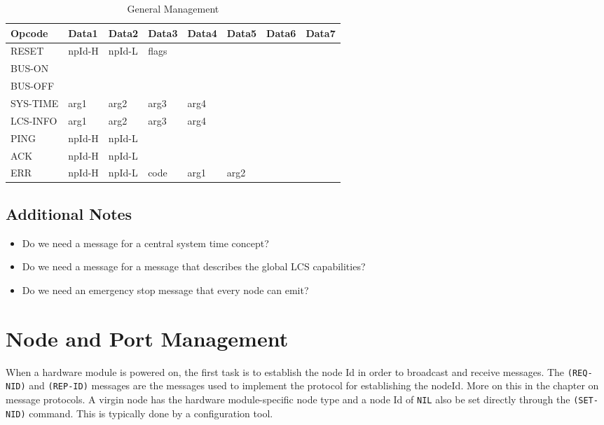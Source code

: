 \begin{table}[h!]
    \begin{center}
        \caption{General Management}
        \begin{tabular}{|l|l|l|l|l|l|l|l|}
            \toprule
            \textbf{Opcode} & \textbf{Data1} & \textbf{Data2} & \textbf{Data3} & \textbf{Data4} & \textbf{Data5} & \textbf{Data6} & \textbf{Data7} \\
            \midrule
            RESET & npId-H & npId-L & flags & & & & \\
            BUS-ON & & & & & & & \\
            BUS-OFF & & & & & & & \\
            SYS-TIME & arg1 & arg2 & arg3 & arg4 & & & \\
            LCS-INFO & arg1 & arg2 & arg3 & arg4 & & & \\
            PING & npId-H & npId-L & & & & & \\
            ACK & npId-H & npId-L & & & & & \\
            ERR & npId-H & npId-L & code & arg1 & arg2 & & \\
            \bottomrule
        \end{tabular}
    \end{center}
\end{table}

\subsection*{Additional Notes}
\begin{itemize}
    \item Do we need a message for a central system time concept?
    \item Do we need a message for a message that describes the global LCS capabilities?
    \item Do we need an emergency stop message that every node can emit?
\end{itemize}

\section{Node and Port Management}

When a hardware module is powered on, the first task is to establish the node Id in order to broadcast and receive messages. The \texttt{(REQ-NID)} and \texttt{(REP-ID)} messages are the messages used to implement the protocol for establishing the nodeId. More on this in the chapter on message protocols. A virgin node has the hardware module-specific node type and a node Id of \texttt{NIL} also be set directly through the \texttt{(SET-NID)} command. This is typically done by a configuration tool.

